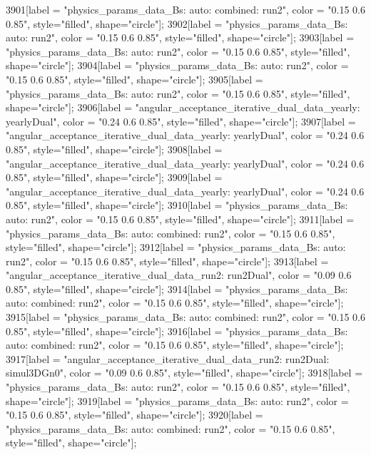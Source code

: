 {	3901[label = "physics_params_data_Bs\nfit: auto\ntrigger: combined\nyear: run2", color = "0.15 0.6 0.85", style="filled", shape="circle"];
	3902[label = "physics_params_data_Bs\nfit: auto\nyear: run2", color = "0.15 0.6 0.85", style="filled", shape="circle"];
	3903[label = "physics_params_data_Bs\nfit: auto\nyear: run2", color = "0.15 0.6 0.85", style="filled", shape="circle"];
	3904[label = "physics_params_data_Bs\nfit: auto\nyear: run2", color = "0.15 0.6 0.85", style="filled", shape="circle"];
	3905[label = "physics_params_data_Bs\nfit: auto\nyear: run2", color = "0.15 0.6 0.85", style="filled", shape="circle"];
	3906[label = "angular_acceptance_iterative_dual_data_yearly\nangacc: yearlyDual", color = "0.24 0.6 0.85", style="filled", shape="circle"];
	3907[label = "angular_acceptance_iterative_dual_data_yearly\nangacc: yearlyDual", color = "0.24 0.6 0.85", style="filled", shape="circle"];
	3908[label = "angular_acceptance_iterative_dual_data_yearly\nangacc: yearlyDual", color = "0.24 0.6 0.85", style="filled", shape="circle"];
	3909[label = "angular_acceptance_iterative_dual_data_yearly\nangacc: yearlyDual", color = "0.24 0.6 0.85", style="filled", shape="circle"];
	3910[label = "physics_params_data_Bs\nfit: auto\nyear: run2", color = "0.15 0.6 0.85", style="filled", shape="circle"];
	3911[label = "physics_params_data_Bs\nfit: auto\ntrigger: combined\nyear: run2", color = "0.15 0.6 0.85", style="filled", shape="circle"];
	3912[label = "physics_params_data_Bs\nfit: auto\nyear: run2", color = "0.15 0.6 0.85", style="filled", shape="circle"];
	3913[label = "angular_acceptance_iterative_dual_data_run2\nangacc: run2Dual", color = "0.09 0.6 0.85", style="filled", shape="circle"];
	3914[label = "physics_params_data_Bs\nfit: auto\ntrigger: combined\nyear: run2", color = "0.15 0.6 0.85", style="filled", shape="circle"];
	3915[label = "physics_params_data_Bs\nfit: auto\ntrigger: combined\nyear: run2", color = "0.15 0.6 0.85", style="filled", shape="circle"];
	3916[label = "physics_params_data_Bs\nfit: auto\ntrigger: combined\nyear: run2", color = "0.15 0.6 0.85", style="filled", shape="circle"];
	3917[label = "angular_acceptance_iterative_dual_data_run2\nangacc: run2Dual\ntimeacc: simul3DGn0", color = "0.09 0.6 0.85", style="filled", shape="circle"];
	3918[label = "physics_params_data_Bs\nfit: auto\nyear: run2", color = "0.15 0.6 0.85", style="filled", shape="circle"];
	3919[label = "physics_params_data_Bs\nfit: auto\nyear: run2", color = "0.15 0.6 0.85", style="filled", shape="circle"];
	3920[label = "physics_params_data_Bs\nfit: auto\ntrigger: combined\nyear: run2", color = "0.15 0.6 0.85", style="filled", shape="circle"];
}

